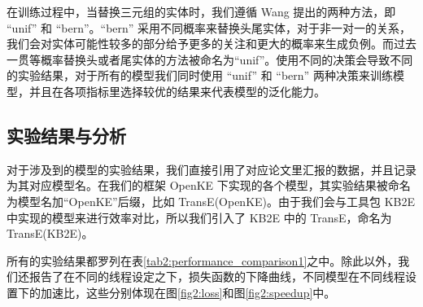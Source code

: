 在训练过程中，当替换三元组的实体时，我们遵循 Wang \cite{wang2014transh} 提出的两种方法，即 ``unif'' 和 ``bern''。``bern'' 采用不同概率来替换头尾实体，对于非一对一的关系，我们会对实体可能性较多的部分给予更多的关注和更大的概率来生成负例。而过去一贯等概率替换头或者尾实体的方法被命名为``unif''。使用不同的决策会导致不同的实验结果，对于所有的模型我们同时使用 ``unif'' 和 ``bern'' 两种决策来训练模型，并且在各项指标里选择较优的结果来代表模型的泛化能力。

\subsection{实验结果与分析}

对于涉及到的模型的实验结果，我们直接引用了对应论文里汇报的数据，并且记录为其对应模型名。在我们的框架 OpenKE 下实现的各个模型，其实验结果被命名为模型名加``OpenKE''后缀，比如 TransE(OpenKE)。由于我们会与工具包 KB2E 中实现的模型来进行效率对比，所以我们引入了 KB2E 中的 TransE，命名为 TransE(KB2E)。

所有的实验结果都罗列在表\ref{tab2:performance_comparison1}之中。除此以外，我们还报告了在不同的线程设定之下，损失函数的下降曲线，不同模型在不同线程设置下的加速比，这些分别体现在图\ref{fig2:loss}和图\ref{fig2:speedup}中。


\vspace{25pt}
\begin{table}[h]  
  \centering
  \setlength{\abovecaptionskip}{30pt}   
  \caption{WN18、FB15K上链接预测结果}  
  \label{tab2:performance_comparison1}  
\end{table}

